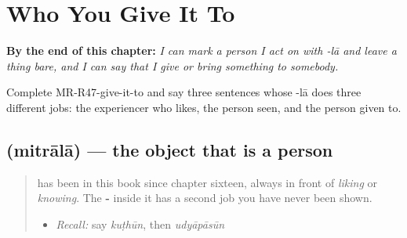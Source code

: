 
\chapter{Who You Give It To}
\label{ch:mr-object-marking}

\begin{chapteropening}
\textbf{By the end of this chapter:} \emph{I can mark a person I act on with -lā and leave a thing bare, and I can say that I give or bring something to somebody.}

Complete MR-R47-give-it-to and say three sentences whose -lā does three different jobs: the experiencer who likes, the person seen, and the person given to.
\end{chapteropening}

\section[\texorpdfstring{\mr{मित्राला} (mitrālā)}{मित्राला (mitrālā)}]{ (mitrālā) — the object that is a person}

\label{lesson:MR-C47-laa-object}



\begin{quote}
\textbf{} has been in this book since chapter sixteen, always in front of \emph{liking} or \emph{knowing}. The \textbf{-} inside it has a second job you have never been shown.

\begin{itemize}
\raggedright
  \item \emph{Recall:} say \emph{kuṭhūn}, then \emph{udyāpāsūn}
\end{itemize}
\end{quote}

